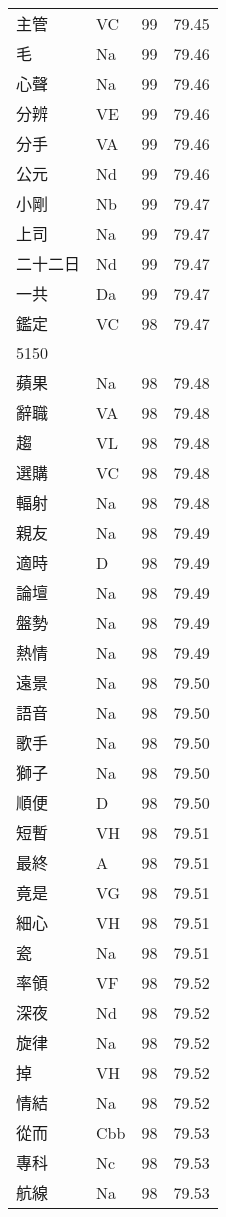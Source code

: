 \documentclass[twocolumn]{book}
\begin{document}
\begin{supertabular}{llrr}
主管 & VC & 99 &  79.45\\
毛 & Na & 99 &  79.46\\
心聲 & Na & 99 &  79.46\\
分辨 & VE & 99 &  79.46\\
分手 & VA & 99 &  79.46\\
公元 & Nd & 99 &  79.46\\
小剛 & Nb & 99 &  79.47\\
上司 & Na & 99 &  79.47\\
二十二日 & Nd & 99 &  79.47\\
一共 & Da & 99 &  79.47\\
鑑定 & VC & 98 &  79.47\\
5150\\
蘋果 & Na & 98 &  79.48\\
辭職 & VA & 98 &  79.48\\
趨 & VL & 98 &  79.48\\
選購 & VC & 98 &  79.48\\
輻射 & Na & 98 &  79.48\\
親友 & Na & 98 &  79.49\\
適時 & D & 98 &  79.49\\
論壇 & Na & 98 &  79.49\\
盤勢 & Na & 98 &  79.49\\
熱情 & Na & 98 &  79.49\\
遠景 & Na & 98 &  79.50\\
語音 & Na & 98 &  79.50\\
歌手 & Na & 98 &  79.50\\
獅子 & Na & 98 &  79.50\\
順便 & D & 98 &  79.50\\
短暫 & VH & 98 &  79.51\\
最終 & A & 98 &  79.51\\
竟是 & VG & 98 &  79.51\\
細心 & VH & 98 &  79.51\\
瓷 & Na & 98 &  79.51\\
率領 & VF & 98 &  79.52\\
深夜 & Nd & 98 &  79.52\\
旋律 & Na & 98 &  79.52\\
掉 & VH & 98 &  79.52\\
情結 & Na & 98 &  79.52\\
從而 & Cbb & 98 &  79.53\\
專科 & Nc & 98 &  79.53\\
航線 & Na & 98 &  79.53\\

\end{supertabular}
\end{document}
